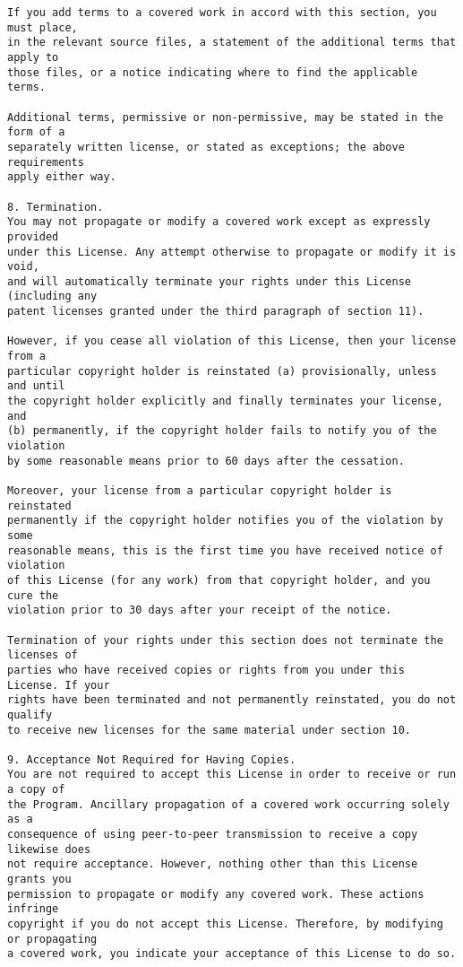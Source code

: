 \begin{verbatim}
If you add terms to a covered work in accord with this section, you must place,
in the relevant source files, a statement of the additional terms that apply to
those files, or a notice indicating where to find the applicable terms.

Additional terms, permissive or non-permissive, may be stated in the form of a
separately written license, or stated as exceptions; the above requirements
apply either way.

8. Termination.
You may not propagate or modify a covered work except as expressly provided
under this License. Any attempt otherwise to propagate or modify it is void,
and will automatically terminate your rights under this License (including any
patent licenses granted under the third paragraph of section 11).

However, if you cease all violation of this License, then your license from a
particular copyright holder is reinstated (a) provisionally, unless and until
the copyright holder explicitly and finally terminates your license, and
(b) permanently, if the copyright holder fails to notify you of the violation
by some reasonable means prior to 60 days after the cessation.

Moreover, your license from a particular copyright holder is reinstated
permanently if the copyright holder notifies you of the violation by some
reasonable means, this is the first time you have received notice of violation
of this License (for any work) from that copyright holder, and you cure the
violation prior to 30 days after your receipt of the notice.

Termination of your rights under this section does not terminate the licenses of
parties who have received copies or rights from you under this License. If your
rights have been terminated and not permanently reinstated, you do not qualify
to receive new licenses for the same material under section 10.

9. Acceptance Not Required for Having Copies.
You are not required to accept this License in order to receive or run a copy of
the Program. Ancillary propagation of a covered work occurring solely as a
consequence of using peer-to-peer transmission to receive a copy likewise does
not require acceptance. However, nothing other than this License grants you
permission to propagate or modify any covered work. These actions infringe
copyright if you do not accept this License. Therefore, by modifying or propagating
a covered work, you indicate your acceptance of this License to do so.


\end{verbatim}
